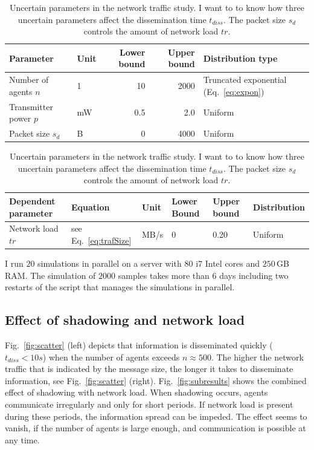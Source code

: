 \begin{table}[H]
\begin{footnotesize}
\begin{tabular}{@{}llrrl@{}}%
\toprule
Parameter                        & Unit & Lower bound & Upper bound & Distribution                                    type \\ \midrule
Number of agents $n$ & 1    & 10          & 2000      & Truncated exponential (Eq.~\ref{eq:expon})  \\
Transmitter power $p$      & mW   & 0.5         & 2.0       & Uniform   \\
Packet size $s_d$        & B    & 0           & 4000        & Uniform  \\
\bottomrule 
\end{tabular}%
\end{footnotesize}
\begin{footnotesize}

\bigskip
\noindent

\begin{tabular}{@{}llllll@{}}
\toprule
Dependent parameter & Equation & Unit & Lower Bound & Upper bound & Distribution \\ \midrule
Network load ${tr}$    & see Eq.~\ref{eq:trafSize}           & MB/s    & 0          & 0.20      & Uniform                                             \\ \bottomrule
\end{tabular}
\end{footnotesize}
\caption[Uncertain parameters in the network traffic study]{Uncertain parameters in the network traffic study. I want to to know how three uncertain parameters affect the dissemination time $t_{diss}$. The packet size $s_d$ controls the amount of network load ${tr}$.}%
\label{tab:parameter}%
\end{table}%

I run $20$ simulations in parallel on a server with $80$ i7 Intel cores and $250$\,GB RAM. The simulation of $2000$ samples takes more than $6$ days including two restarts of the script that manages the simulations in parallel.

\subsection*{Effect of shadowing and network load}%
\label{sec:simulationResults}

Fig.~\ref{fig:scatter} (left) depicts that information is disseminated quickly ($t_{diss}<10s$) when the number of agents exceeds $n\approx500$. The higher the network traffic that is indicated by the message size, the longer it takes to disseminate information, see Fig.~\ref{fig:scatter} (right). Fig.~\ref{fig:subresults} shows the combined effect of shadowing with network load. When shadowing occurs, agents communicate irregularly and only for short periods. If network load is present during these periods, the information spread can be impeded. The effect seems to vanish, if the number of agents is large enough, and communication is possible at any time. 


